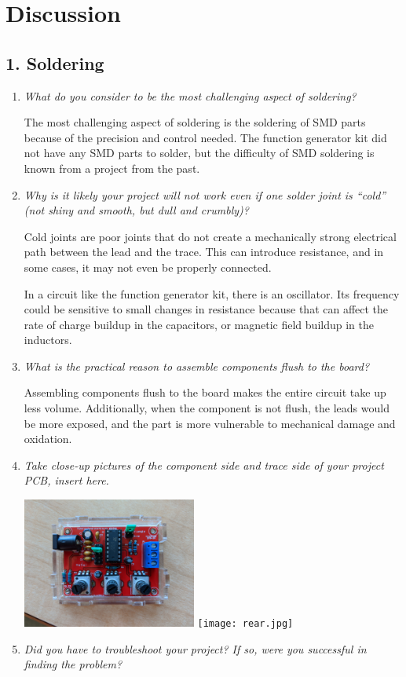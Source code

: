 \documentclass[12pt]{article}
\begin{document}
\section*{Discussion}

\subsection*{1. Soldering}
\begin{enumerate}
    \item {
        \textit{What do you consider to be the most challenging aspect of soldering?}

        The most challenging aspect of soldering is the soldering of SMD parts because of the precision
        and control needed. The function generator kit did not have any SMD parts to solder, but the difficulty
        of SMD soldering is known from a project from the past.
    } 
    \item {
        \textit{Why is it likely your project will not work even if one solder joint is ``cold'' (not shiny and smooth, but dull and crumbly)?}

        Cold joints are poor joints that do not create a mechanically strong electrical path between the lead and the trace. This can introduce resistance,
        and in some cases, it may not even be properly connected.

        In a circuit like the function generator kit, there is an oscillator. Its frequency could be sensitive to small changes in resistance because that can 
        affect the rate of charge buildup in the capacitors, or magnetic field buildup in the inductors.
    }  
    \item {
        \textit{What is the practical reason to assemble components flush to the board?}
        
        Assembling components flush to the board makes the entire circuit take up less volume. Additionally, when the component is not flush,
        the leads would be more exposed, and the part is more vulnerable to mechanical damage and oxidation.
    }  
    \item {
        \textit{Take close-up pictures of the component side and trace side of your project PCB, insert here.}
       
        \centering

        \includegraphics[width=0.45\textwidth]{fr2.jpg}
        \texttt{[image: rear.jpg]}
    }
    \item {
        \textit{Did you have to troubleshoot your project? If so, were you successful in finding the problem?}
        
}
\end{enumerate}
\end{document}
